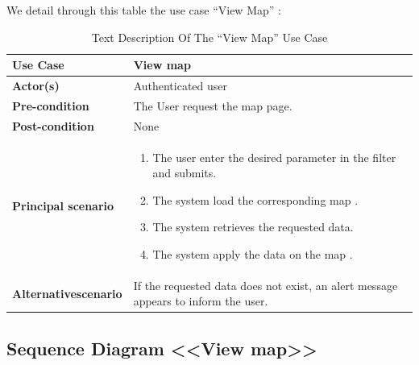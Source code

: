 \vspace{0.25cm}
We detail through this table the use case “View Map” :

\begin{table}[H]
    \renewcommand{\arraystretch}{1.5}
    
   \begin{tabular}{|p{}|p{}|}
   \hline
     
        \textbf{Use Case} & View map  \\   \hline
        
        \textbf{Actor(s) } &  Authenticated user   \\   \hline
        \textbf{Pre-condition} & 
              The User request the map page.
        \\  \hline
        \textbf{Post-condition} & None \\   \hline


                \textbf{Principal scenario} &
                \begin{enumerate}[left=0pt]
                    \item The user enter the desired parameter in the filter and submits.
                    \item The system load the corresponding map .
                    \item The system retrieves the requested data.
                    \item The system apply the data on the map .
                    \end{enumerate}  \\   \hline

                     \textbf{Alternative\newline scenario} & 
            If the requested data does not exist, an alert message appears to inform the user.
        \\   \hline
       
\end{tabular}

     \caption{Text Description Of The “View Map” Use Case}
    \label{tab:my_label}
    
\end{table}


\subsection{Sequence Diagram <<View map>> }



